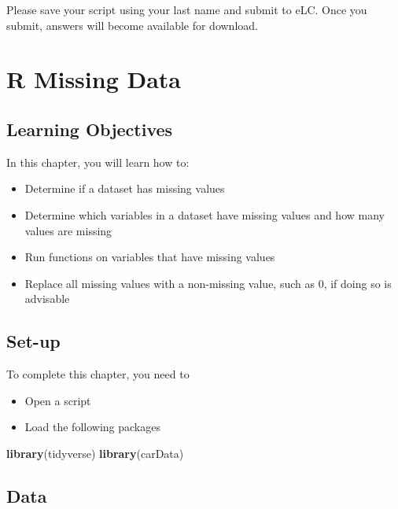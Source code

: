 \documentclass[
]{book}
\newenvironment{Shaded}{\begin{snugshade}}{\end{snugshade}}
\newcommand{\KeywordTok}[1]{\textcolor[rgb]{0.13,0.29,0.53}{\textbf{#1}}}
\newcommand{\NormalTok}[1]{#1}
\providecommand{\tightlist}{%
  \setlength{\itemsep}{0pt}\setlength{\parskip}{0pt}}
\begin{document}
Please save your script using your last name and submit to eLC. Once you submit, answers will become available for download.

\hypertarget{r-missing-data}{%
\chapter{R Missing Data}\label{r-missing-data}}

\hypertarget{learning-objectives}{%
\section{Learning Objectives}\label{learning-objectives}}

In this chapter, you will learn how to:

\begin{itemize}
\tightlist
\item
  Determine if a dataset has missing values
\item
  Determine which variables in a dataset have missing values and how many values are missing
\item
  Run functions on variables that have missing values
\item
  Replace all missing values with a non-missing value, such as 0, if doing so is advisable
\end{itemize}

\hypertarget{set-up}{%
\section{Set-up}\label{set-up}}

To complete this chapter, you need to

\begin{itemize}
\tightlist
\item
  Open a script
\item
  Load the following packages
\end{itemize}

\begin{Shaded}
\begin{Highlighting}[]
\KeywordTok{library}\NormalTok{(tidyverse)}
\KeywordTok{library}\NormalTok{(carData)}
\end{Highlighting}
\end{Shaded}

\hypertarget{data}{%
\section{Data}\label{data}}
\end{document}
